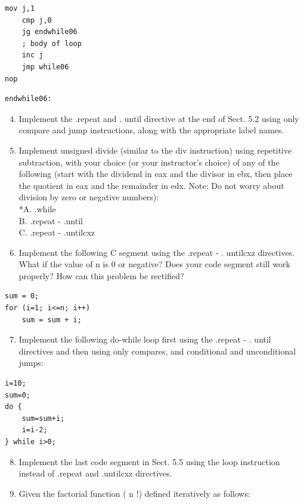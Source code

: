 \documentclass[10pt]{book}
\begin{document}
\begin{verbatim}
mov j,1
    cmp j,0
    jg endwhile06
    ; body of loop
    inc j
    jmp while06
nop
\end{verbatim}

\begin{verbatim}
endwhile06:
\end{verbatim}

\begin{enumerate}
  \setcounter{enumi}{3}
  \item Implement the .repeat and . until directive at the end of Sect. 5.2 using only compare and jump instructions, along with the appropriate label names.
  \item Implement unsigned divide (similar to the div instruction) using repetitive subtraction, with your choice (or your instructor's choice) of any of the following (start with the dividend in eax and the divisor in ebx, then place the quotient in eax and the remainder in edx. Note: Do not worry about division by zero or negative numbers):\\
*A. .while\\
B. .repeat - .until\\
C. .repeat - .untilcxz
  \item Implement the following C segment using the .repeat - . untilcxz directives. What if the value of n is 0 or negative? Does your code segment still work properly? How can this problem be rectified?
\end{enumerate}

\begin{verbatim}
sum = 0;
for (i=1; i<=n; i++)
    sum = sum + i;
\end{verbatim}

\begin{enumerate}
  \setcounter{enumi}{6}
  \item Implement the following do-while loop first using the .repeat - . until directives and then using only compares, and conditional and unconditional jumps:
\end{enumerate}

\begin{verbatim}
i=10;
sum=0;
do {
    sum=sum+i;
    i=i-2;
} while i>0;
\end{verbatim}

\begin{enumerate}
  \setcounter{enumi}{7}
  \item Implement the last code segment in Sect. 5.5 using the loop instruction instead of .repeat and .untilcxz directives.
  \item Given the factorial function ( n !) defined iteratively as follows:
\end{enumerate}
\end{document}
